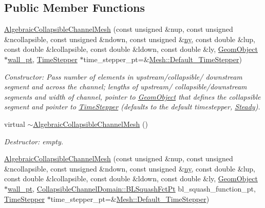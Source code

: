 \subsection*{Public Member Functions}
\begin{DoxyCompactItemize}
\item 
\hyperlink{classoomph_1_1AlgebraicCollapsibleChannelMesh_ac2e77539dfed482cc3d8b7c9e17a9567}{Algebraic\+Collapsible\+Channel\+Mesh} (const unsigned \&nup, const unsigned \&ncollapsible, const unsigned \&ndown, const unsigned \&\hyperlink{classoomph_1_1SimpleRectangularQuadMesh_a45011f22dedd480392b1f376e4269921}{ny}, const double \&lup, const double \&lcollapsible, const double \&ldown, const double \&ly, \hyperlink{classoomph_1_1GeomObject}{Geom\+Object} $\ast$\hyperlink{classoomph_1_1CollapsibleChannelMesh_a04ffeb61678763dfd250962ea9ba614b}{wall\+\_\+pt}, \hyperlink{classoomph_1_1TimeStepper}{Time\+Stepper} $\ast$time\+\_\+stepper\+\_\+pt=\&\hyperlink{classoomph_1_1Mesh_a12243d0fee2b1fcee729ee5a4777ea10}{Mesh\+::\+Default\+\_\+\+Time\+Stepper})
\begin{DoxyCompactList}\small\item\em Constructor\+: Pass number of elements in upstream/collapsible/ downstream segment and across the channel; lengths of upstream/ collapsible/downstream segments and width of channel, pointer to \hyperlink{classoomph_1_1GeomObject}{Geom\+Object} that defines the collapsible segment and pointer to \hyperlink{classoomph_1_1TimeStepper}{Time\+Stepper} (defaults to the default timestepper, \hyperlink{classoomph_1_1Steady}{Steady}). \end{DoxyCompactList}\item 
virtual \hyperlink{classoomph_1_1AlgebraicCollapsibleChannelMesh_ab921ed3dbc5678fc5d39626fdf32c4ed}{$\sim$\+Algebraic\+Collapsible\+Channel\+Mesh} ()
\begin{DoxyCompactList}\small\item\em Destructor\+: empty. \end{DoxyCompactList}\item 
\hyperlink{classoomph_1_1AlgebraicCollapsibleChannelMesh_a3c19524e69a9408c79047d130b79d6b3}{Algebraic\+Collapsible\+Channel\+Mesh} (const unsigned \&nup, const unsigned \&ncollapsible, const unsigned \&ndown, const unsigned \&\hyperlink{classoomph_1_1SimpleRectangularQuadMesh_a45011f22dedd480392b1f376e4269921}{ny}, const double \&lup, const double \&lcollapsible, const double \&ldown, const double \&ly, \hyperlink{classoomph_1_1GeomObject}{Geom\+Object} $\ast$\hyperlink{classoomph_1_1CollapsibleChannelMesh_a04ffeb61678763dfd250962ea9ba614b}{wall\+\_\+pt}, \hyperlink{classoomph_1_1CollapsibleChannelDomain_a2bf1d7943bfac134a5c27a54c7e1faed}{Collapsible\+Channel\+Domain\+::\+B\+L\+Squash\+Fct\+Pt} bl\+\_\+squash\+\_\+function\+\_\+pt, \hyperlink{classoomph_1_1TimeStepper}{Time\+Stepper} $\ast$time\+\_\+stepper\+\_\+pt=\&\hyperlink{classoomph_1_1Mesh_a12243d0fee2b1fcee729ee5a4777ea10}{Mesh\+::\+Default\+\_\+\+Time\+Stepper})

\end{DoxyCompactItemize}
